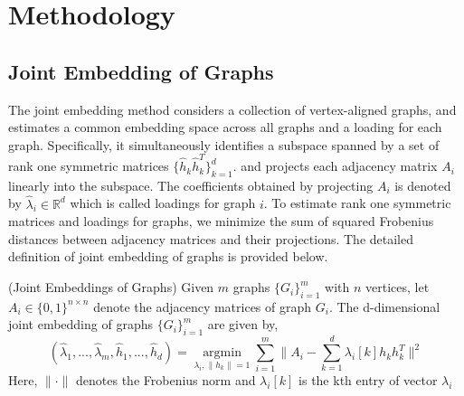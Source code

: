 \documentclass[10pt,journal,compsoc]{IEEEtran}
\newenvironment{definition}[1][Definition]{\begin{trivlist}
		\item[\hskip \labelsep {\bfseries #1}]}{\end{trivlist}}
\begin{document}
\section{Methodology}
\subsection{Joint Embedding of Graphs}
The joint embedding method considers a collection of vertex-aligned graphs, and estimates a common embedding space across all graphs and a loading for each graph. Specifically, it simultaneously identifies a subspace spanned by a set of rank one symmetric matrices $\{\hat{h}_k \hat{h}_k^T\}_{k=1}^{d}$. and projects each adjacency matrix $A_i$ linearly into the subspace. The coefficients obtained by projecting $A_i$ is denoted by $\hat{\lambda}_i \in \mathbb{R}^d$ which is called loadings for graph $i$. To estimate rank one symmetric matrices and loadings for graphs, we minimize the sum of squared Frobenius distances between adjacency matrices and their projections. The detailed definition of joint embedding of graphs is provided below.

\begin{definition} (Joint Embeddings of Graphs) Given $m$  graphs $\{G_i \} _{i=1}^{m}$ with $n$ vertices, let $A_i \in \{0,1\}^{n \times n }$ denote  the adjacency matrices of graph $G_i$. The d-dimensional joint embedding of graphs $\{G_i \} _{i=1}^{m}$ are given by,
\begin{equation}\label{eq:1}
 (\hat{\lambda}_1,...,\hat{\lambda}_m,\hat{h}_1,...,\hat{h}_d) = \underset{\lambda_i,\|h_k\|=1}{\operatorname{argmin}} \sum\limits_{i=1}^{m} \| A_i- \sum\limits_{k=1}^{d} \lambda_{i}[k] h_k h_k^T \|  ^2  
\end{equation}
Here, $\| \cdot \|$ denotes the Frobenius norm and $\lambda_{i}[k]$ is the kth entry of vector $\lambda_i$
\end{definition}
\end{document}
